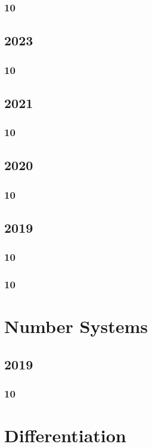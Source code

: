 \documentclass[11pt]{book}
\begin{document}
\subsection{10}

\section{2023}
\subsection{10}

\section{2021}
\subsection{10}

\section{2020}
\subsection{10}

\section{2019}
\subsection{10}

\subsection{10}


\chapter{Number Systems}
\section{2019}
\subsection{10}




\chapter{Differentiation}
\end{document}
